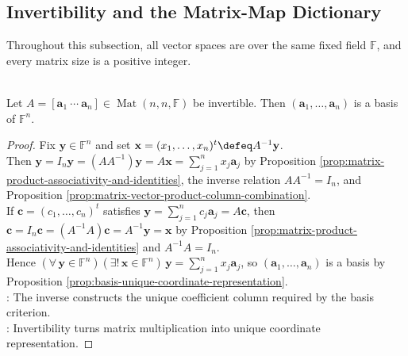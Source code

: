 \subsection{Invertibility and the Matrix-Map Dictionary}
Throughout this subsection, all vector spaces are over the same fixed field $\mathbb{F}$, and every matrix size is a positive integer.

\begin{theorem} \label{thm:invertible-matrix-columns-basis} \\
Let $A=[\mathbf{a}_1\ \cdots\ \mathbf{a}_n]\in\operatorname{Mat}(n,n,\mathbb{F})$ be invertible. Then $(\mathbf{a}_1,\ldots,\mathbf{a}_n)$ is a basis of $\mathbb{F}^n$.
\begin{proof}
Fix $\mathbf{y}\in\mathbb{F}^n$ and set $\mathbf{x}=(x_1,\ldots,x_n)^t\defeq A^{-1}\mathbf{y}$.\\
Then $\mathbf{y}=I_n\mathbf{y}=(AA^{-1})\mathbf{y}=A\mathbf{x}=\sum\limits_{j=1}^{n}x_j\mathbf{a}_j$ by Proposition \ref{prop:matrix-product-associativity-and-identities}, the inverse relation $AA^{-1}=I_n$, and Proposition \ref{prop:matrix-vector-product-column-combination}.\\
If $\mathbf{c}=(c_1,\ldots,c_n)^t$ satisfies $\mathbf{y}=\sum\limits_{j=1}^{n}c_j\mathbf{a}_j=A\mathbf{c}$, then $\mathbf{c}=I_n\mathbf{c}=(A^{-1}A)\mathbf{c}=A^{-1}\mathbf{y}=\mathbf{x}$ by Proposition \ref{prop:matrix-product-associativity-and-identities} and $A^{-1}A=I_n$.\\
Hence $(\forall\,\mathbf{y}\in\mathbb{F}^n)(\exists!\,\mathbf{x}\in\mathbb{F}^n)\,\mathbf{y}=\sum\limits_{j=1}^{n}x_j\mathbf{a}_j$, so $(\mathbf{a}_1,\ldots,\mathbf{a}_n)$ is a basis by Proposition \ref{prop:basis-unique-coordinate-representation}.\\
: The inverse constructs the unique coefficient column required by the basis criterion.\\
: Invertibility turns matrix multiplication into unique coordinate representation.
\end{proof}
\end{theorem}

